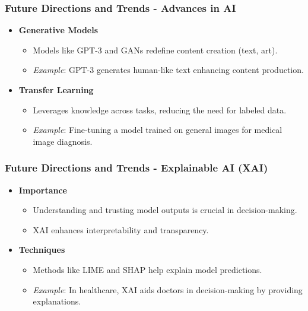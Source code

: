 \documentclass[aspectratio=169]{beamer}
\begin{document}
\begin{frame}[fragile]
    \frametitle{Future Directions and Trends - Advances in AI}
    \begin{itemize}
        \item \textbf{Generative Models}
          \begin{itemize}
              \item Models like GPT-3 and GANs redefine content creation (text, art).
              \item \textit{Example}: GPT-3 generates human-like text enhancing content production.
          \end{itemize}
          
        \item \textbf{Transfer Learning}
          \begin{itemize}
              \item Leverages knowledge across tasks, reducing the need for labeled data.
              \item \textit{Example}: Fine-tuning a model trained on general images for medical image diagnosis.
          \end{itemize}
    \end{itemize}
\end{frame}

\begin{frame}[fragile]
    \frametitle{Future Directions and Trends - Explainable AI (XAI)}
    \begin{itemize}
        \item \textbf{Importance}
          \begin{itemize}
              \item Understanding and trusting model outputs is crucial in decision-making.
              \item XAI enhances interpretability and transparency.
          \end{itemize}

        \item \textbf{Techniques}
          \begin{itemize}
              \item Methods like LIME and SHAP help explain model predictions.
              \item \textit{Example}: In healthcare, XAI aids doctors in decision-making by providing explanations.
          \end{itemize}
    \end{itemize}
\end{frame}
\end{document}
